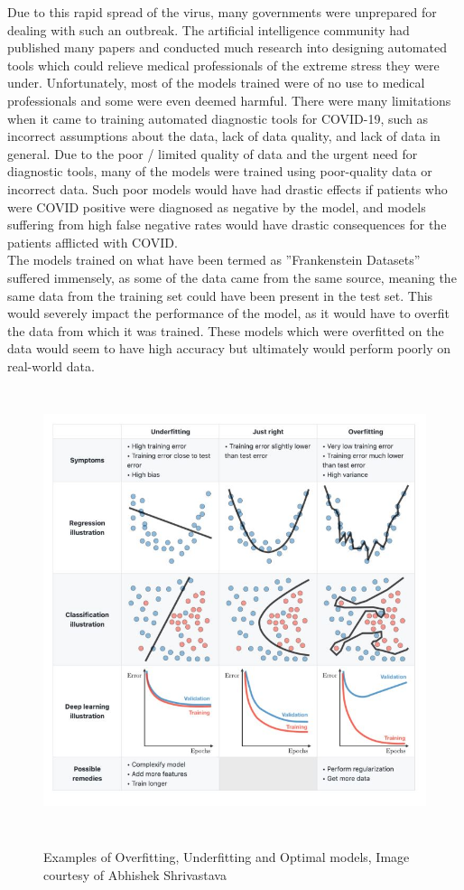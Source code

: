 Due to this rapid spread of the virus, many governments were unprepared for dealing with such an outbreak.  The artificial intelligence community had published many papers and conducted much research into designing automated tools which could relieve medical professionals of the extreme stress they were under. Unfortunately, most of the models trained were of no use to medical professionals and some were even deemed harmful\cite{mitTechReviewCovid19}.    There were many limitations when it came to training automated diagnostic tools for COVID-19, such as incorrect assumptions about the data, lack of data quality, and lack of data in general.  Due to the poor / limited quality of data and the urgent need for diagnostic tools, many of the models were trained using poor-quality data or incorrect data.  Such poor models would have had drastic effects if patients who were COVID positive were diagnosed as negative by the model, and models suffering from high false negative rates would have drastic consequences for the patients afflicted with COVID.
\\
The models trained on what have been termed as ''Frankenstein Datasets'' suffered immensely, as some of the data came from the same source, meaning the same data from the training set could have been present in the test set. This would severely impact the performance of the model, as it would have to overfit the data from which it was trained.  These models which were overfitted on the data would seem to have high accuracy but ultimately would perform poorly on real-world data.
 \begin{figure}[H]
    \centering
    \includegraphics[width=1\textwidth,height=13cm,keepaspectratio]{Images/OverfittingUnderfitting.png}\\
    \caption{Examples of Overfitting, Underfitting and Optimal models, Image courtesy of Abhishek Shrivastava\cite{overfittingKaggle}}
    \label{fig:Examples of Overfitting, Underfitting and optimal models}
\end{figure}
